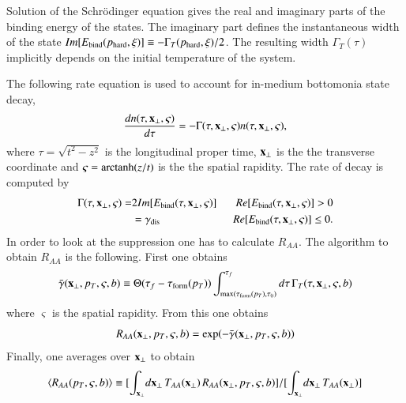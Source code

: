 {{Solution of the Schr\"odinger equation gives the real and imaginary parts of 
the binding energy of the states.  The imaginary part defines the instantaneous width of the state
$Im[E_{\rm bind}(p_{\rm hard},\xi)] \equiv -\Gamma_T(p_{\rm hard},\xi)/2$. 
The resulting width $\Gamma_T(\tau)$ implicitly depends on the initial temperature of the
system.

The following rate equation is used to account for in-medium bottomonia state decay,
%
\begin{equation} \label{eq:rate}
\frac{dn(\tau,{\bf x}_\perp,\varsigma)}{d\tau} = -\Gamma(\tau,{\bf x}_\perp,\varsigma)n(\tau,{\bf x}_\perp,\varsigma) ,
\end{equation}
%
where   $\tau = \sqrt{t^{2} - z^{2}}$ is the longitudinal proper time,  ${\bf x}_{\perp}$ is the the transverse coordinate and 
 $\varsigma = {\rm arctanh}(z/t)$ is the the spatial rapidity. The rate of decay is computed by~\cite{Strickland:2011aa}
%
\begin{eqnarray}
\Gamma(\tau, {\bf x}_{\perp}, \varsigma) = 
&2Im[E_{\text{bind}}(\tau, {\bf x}_{\perp}, \varsigma)] & \ \ Re[E_{\text{bind}}(\tau, {\bf x}_{\perp}, \varsigma)] > 0 \\ 
&=\gamma_{\text{dis}} & \ \ Re[E_{\text{bind}}(\tau, {\bf x}_{\perp}, \varsigma)] \leq 0. 
\end{eqnarray}
%
In order to look at the suppression one has to calculate $R_{AA}$. The algorithm to obtain $R_{AA}$ is the following. 
First one obtains 
\begin{equation}
 \bar{\gamma}({\bf x}_\perp,p_T,
\varsigma,b) \equiv \Theta(\tau_f-\tau_{\rm form}(p_T)) \int_{{\rm max}(\tau_{\rm form}(p_T),\tau_0)}^{\tau_f} 
d\tau\,\Gamma_T(\tau,{\bf x}_\perp,\varsigma,b) 
\end{equation}
where $\varsigma$ is the spatial
rapidity.  From this one obtains  
\begin{equation}
R_{AA}({\bf x}_\perp,p_T,\varsigma,b) =%
\exp\!\left(-\bar{\gamma}({\bf x}_\perp,p_T,\varsigma,b) \right)
\end{equation}
  Finally, one averages
over ${\bf x}_\perp$ to obtain 
\begin{equation}
\langle R_{AA}(p_T,\varsigma,b) \rangle \equiv 
[\int_{{\bf x}_\perp} \! d{\bf x}_\perp \, T_{AA}({\bf x}_\perp)\,%
R_{AA}({\bf x}_\perp,p_T,\varsigma,b)]/[\int_{{\bf x}_\perp} \! d{\bf x}_\perp \,%
T_{AA}({\bf x}_\perp)]
\end{equation} 

}}
